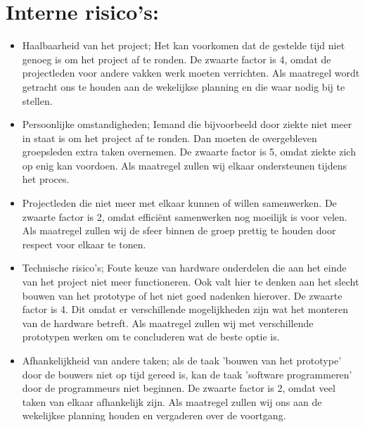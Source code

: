 \documentclass[oneside]{book}
\begin{document}
\section*{Interne risico's:}
\begin{itemize}
	\item Haalbaarheid van het project; Het kan voorkomen dat de gestelde
   tijd niet genoeg is om het project af te ronden. De zwaarte factor is 4, omdat de 
   projectleden voor andere vakken werk moeten verrichten. Als maatregel wordt getracht ons  
   te houden aan de wekelijkse planning en die waar nodig bij te stellen.

	\item Persoonlijke omstandigheden; Iemand die bijvoorbeeld door ziekte niet meer in staat is om   
   het project af te ronden. Dan moeten de overgebleven groepsleden extra taken overnemen. 
   De zwaarte factor is 5,  omdat ziekte zich op enig kan voordoen. Als maatregel zullen wij 
   elkaar ondersteunen tijdens het proces. 

	\item Projectleden die niet meer met elkaar kunnen of willen samenwerken. De zwaarte factor is 2, 
   omdat efficiënt samenwerken nog moeilijk is voor velen. Als maatregel  
    zullen wij de sfeer binnen de groep prettig te houden door respect voor elkaar te tonen.

	\item Technische risico's; Foute keuze van hardware onderdelen die 
   aan het einde van het project niet meer functioneren. Ook valt hier te denken aan het slecht  
   bouwen van het prototype of het niet goed nadenken hierover. De zwaarte factor is 4. Dit 
   omdat er verschillende mogelijkheden zijn wat het monteren van de hardware 
   betreft. Als maatregel zullen wij met verschillende prototypen werken om te concluderen wat 
   de beste optie is.  

	\item Afhankelijkheid  van andere taken; als de taak 'bouwen van het prototype' door de
   bouwers niet op tijd gereed is, kan de taak 'software programmeren' door de programmeurs  
   niet beginnen. De zwaarte factor is 2, omdat veel taken van elkaar afhankelijk  
   zijn. Als maatregel zullen wij ons aan de wekelijkse planning houden en vergaderen over de 
   voortgang.
\end{itemize}
 
 \clearpage
\end{document}
